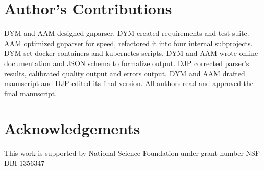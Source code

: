 \documentclass{bmcart}
\begin{document}
\section*{Author's Contributions}

DYM and AAM designed gnparser. DYM created requirements and test suite. AAM
optimized gnparser for speed, refactored it into four internal subprojects.
DYM set docker containers and kubernetes scripts. DYM and AAM wrote online
documentation and JSON schema to formalize output. DJP corrected parser's
results, calibrated quality output and errors output. DYM and AAM drafted
manuscript and DJP edited its final version. All authors read and approved the
final manuscript.

\section*{Acknowledgements}

This work is supported by National Science Foundation under grant number NSF
DBI-1356347


\end{document}
